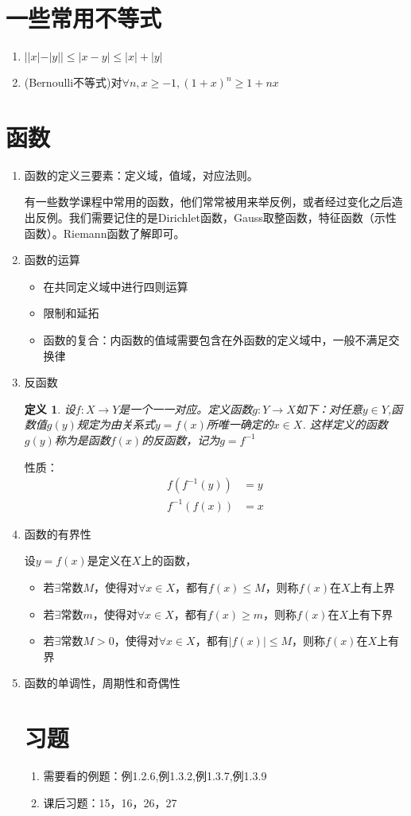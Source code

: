 \documentclass{ctexart}
\newtheorem{myDef}{定义}
\begin{document}
\section{一些常用不等式}
\begin{enumerate}[(1)]
	\item $||x|-|y||\leq|x-y|\leq|x|+|y|$
	\item (Bernoulli不等式)对$\forall n,x\geq-1,(1+x)^n\geq1+nx$
\end{enumerate}

\section{函数}
\begin{enumerate}[(1)]
	\item 函数的定义三要素：定义域，值域，对应法则。\par 有一些数学课程中常用的函数，他们常常被用来举反例，或者经过变化之后造出反例。我们需要记住的是Dirichlet函数，Gauss取整函数，特征函数（示性函数）。Riemann函数了解即可。
	\item 函数的运算
	\begin{itemize}
		\item 在共同定义域中进行四则运算
		\item 限制和延拓
		\item 函数的复合：内函数的值域需要包含在外函数的定义域中，一般不满足交换律
	\end{itemize}
	\item 反函数
	\begin{myDef}
	设$f:X\rightarrow Y$是一个一一对应。定义函数$g:Y\rightarrow X$如下：对任意$y\in Y$,函数值$g(y)$规定为由关系式$y = f(x)$所唯一确定的$x\in X$. 这样定义的函数$g(y)$称为是函数$f(x)$的反函数，记为$g = f^{-1}$
	\end{myDef}
	性质：
	\begin{equation*}
	\begin{aligned}
	f(f^{-1}(y))&=y\\
	f^{-1}(f(x))&=x
	\end{aligned}
	\end{equation*}
	

	\item 函数的有界性\par
	设$y = f(x)$是定义在$X$上的函数，
	\begin{itemize}
		\item 若$\exists$常数$M$，使得对$\forall x\in X$，都有$f(x)\leq M$，则称$f(x)$在$X$上有上界
		\item 若$\exists$常数$m$，使得对$\forall x\in X$，都有$f(x)\geq m$，则称$f(x)$在$X$上有下界
		\item 若$\exists$常数$M>0$，使得对$\forall x\in X$，都有$|f(x)|\leq M$，则称$f(x)$在$X$上有界
	\end{itemize}

	\item 函数的单调性，周期性和奇偶性

\section{习题}
\begin{enumerate}[(1)]
	\item 需要看的例题：例1.2.6,例1.3.2,例1.3.7,例1.3.9
	\item 课后习题：15，16，26，27
\end{enumerate}

\end{enumerate}
\end{document}
